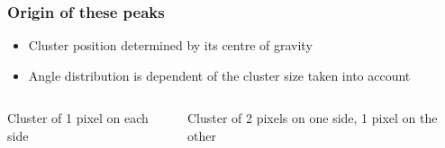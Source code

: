 \documentclass{beamer}
\newcommand{\degres}{\ensuremath{^\circ}}
\begin{document}
\begin{frame}[plain]
    \frametitle{Origin of these peaks}

    \vspace{-0.3cm}
    \begin{itemize}
        \item Cluster position determined by its centre of gravity %
        \item Angle distribution is dependent of the cluster size taken into account
    \end{itemize}

    \vspace{-0.2cm}
    \begin{columns}[b]
       \begin{column}{4cm}
        \begin{center}
            
            \scriptsize{Cluster of 1 pixel on each side}
    
            
%
        \end{center}
       \end{column}

       \begin{column}{4cm}
         \begin{center}
            \scriptsize{Cluster of 2 pixels on one side, 1 pixel on the other}
            

\end{center}
\end{column}
\end{columns}
\end{frame}
\end{document}
